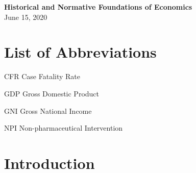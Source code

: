 \documentclass[12pt,a4paper]{article}
\begin{document}
\begin{center}
  \textbf{Historical and Normative Foundations of Economics} \\\vspace{0.5cm}
  June 15, 2020
  
\end{center}


\pagebreak
\pagestyle{plain}
\tableofcontents
\pagebreak
\listoffigures
\newpage
{}
 
\section*{List of Abbreviations}
 
\begin{abbrv}
 
\item[CFR]			Case Fatality Rate
\item[GDP]			Gross Domestic Product
\item[GNI]			Gross National Income
\item[NPI]			Non-pharmaceutical Intervention

\end{abbrv}
\newpage
\setcounter{page}{2}
\setlength{\baselineskip}{1.5\baselineskip}
\pagestyle{plain}


\section{Introduction}

\end{document}

